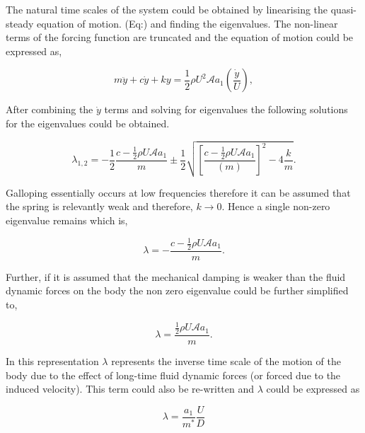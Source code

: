 The natural time scales of the system could be obtained by linearising the quasi-steady equation of motion. (Eq:) and finding the eigenvalues. The non-linear terms of the forcing function are truncated and the equation of motion could be expressed as, 

\begin{equation}
\label{eqn:eom_linear}
m\ddot{y}{+}c\dot{y}{+}ky{=}\frac{1}{2}\rho U^2 \mathcal{A} a_1\left(\frac{\dot{y}}{U}\right),
\end{equation}

After combining the $\dot{y}$ terms and solving for eigenvalues the following solutions for the eigenvalues could be obtained. 

 \begin{equation}
 \label{eqn:eigs}
 \lambda_{1,2}= -\frac{1}{2}\frac{c-\frac{1}{2}\rho U\mathcal{A}a_1}{m}\pm\frac{1}{2}\sqrt{\left[\frac{c-\frac{1}{2}\rho U\mathcal{A}a_1}{(m)}\right]^2-4\frac{k}{m}}.
 \end{equation} 
 
 Galloping essentially occurs at low frequencies therefore it can be assumed that the spring is relevantly weak and therefore, $k \rightarrow 0$. Hence a single non-zero eigenvalue remains which is, 
  
  \begin{equation}
  \label{eqn:eigs_nospring}
  \lambda=-\frac{c-\frac{1}{2}\rho U\mathcal{A}a_1}{m}.
  \end{equation}
  
  Further, if it is assumed that the mechanical damping is weaker than the fluid dynamic forces on the body the non zero eigenvalue could be further simplified to,
  
 \begin{equation}
 \label{eqn:eigs_nospring_nodamp}
 \lambda=\frac{\frac{1}{2}\rho U\mathcal{A}a_1}{m}.
 \end{equation}  

In this representation $\lambda$ represents the inverse time scale of the motion of the body due to the effect of long-time fluid dynamic forces (or forced due to the induced velocity). This term could also be re-written and $\lambda$ could be expressed as 

\begin{equation}
\label{eqn:timescale}
\lambda = \frac{a_1}{m^*}\frac{U}{D}
\end{equation}


